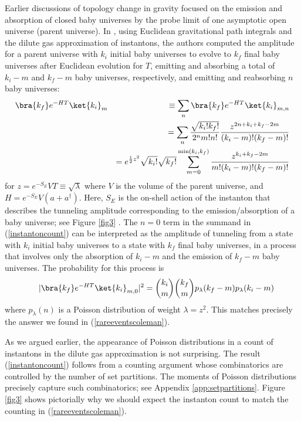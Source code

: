 \documentclass[a4paper,11pt]{article}
\theoremstyle{definition}
\numberwithin{equation}{section}
\newcommand{\nn}{\nonumber}
\begin{document}
Earlier discussions of topology change in gravity focused on the emission and absorption of closed baby universes by the probe limit of one asymptotic open universe (parent universe). In \cite{giddings1988loss}, using Euclidean gravitational path integrals and the dilute gas approximation of instantons, the authors computed the amplitude for a parent universe with $k_i$ initial baby universes to evolve to $k_f$ final baby universes after Euclidean evolution for $T$, emitting and absorbing a total of $k_i-m$ and $k_f-m$ baby universes, respectively, and emitting and reabsorbing $n$ baby universes:
\begin{eqnarray}\label{instantoncount}
    \bra{k_f}e^{-H T}\ket{k_i}_{m}&&\equiv \sum_n  \bra{k_f}e^{-H T}\ket{k_i}_{m,n}\nn\\
    &&=\sum_n \frac{\sqrt{k_i!k_f!}}{2^nm!n!}\frac{z^{2n+k_i+k_f-2m}}{(k_i-m)!(k_f-m)!} \nn\\
    &&=e^{\frac{1}{2}z^2}\sqrt{k_i!}\sqrt{k_f!}\sum_{m=0}^{\min(k_i,k_f)}\frac{z^{k_i+k_f-2m}}{m!(k_i-m)!(k_f-m)!}
\end{eqnarray}
for $z=e^{-S_E}VT\equiv \sqrt{\lambda}$ where $V$ is the volume of the parent universe, and $H=e^{-S_E}V (a+a^\dagger)$. Here, $S_E$ is the on-shell action of the instanton that describes the tunneling amplitude corresponding to the emission/absorption of a baby universe; see Figure \ref{fig3} \cite{giddings1988axion}. 
The $n=0$ term in the summand in (\ref{instantoncount}) can be interpreted as the amplitude of tunneling from a state with $k_i$ initial baby universes to a state with $k_f$ final baby universes, in a process that involves only the absorption of $k_i-m$ and the emission of $k_f-m$ baby universes. The probability for this process is
\begin{eqnarray}
&&|\bra{k_f}e^{-HT}\ket{k_i}_{m,0}|^2={k_i \choose m}{k_f \choose m}p_\lambda(k_f-m)p_\lambda(k_i-m)
\end{eqnarray}
where $p_\lambda(n)$ is a Poisson distribution of weight $\lambda=z^2$. This matches precisely the answer we found in (\ref{rareeventscoleman}).

As we argued earlier, the appearance of Poisson distributions in a count of instantons in the dilute gas approximation is not surprising. The result (\ref{instantoncount}) follows from a counting argument whose combinatorics are controlled by the number of set partitions. The moments of Poisson distributions precisely capture such combinatorics; see Appendix \ref{app:setpartitions}. Figure \ref{fig3} shows pictorially why we should expect the instanton count to match the counting in (\ref{rareeventscoleman}). 
\end{document}
